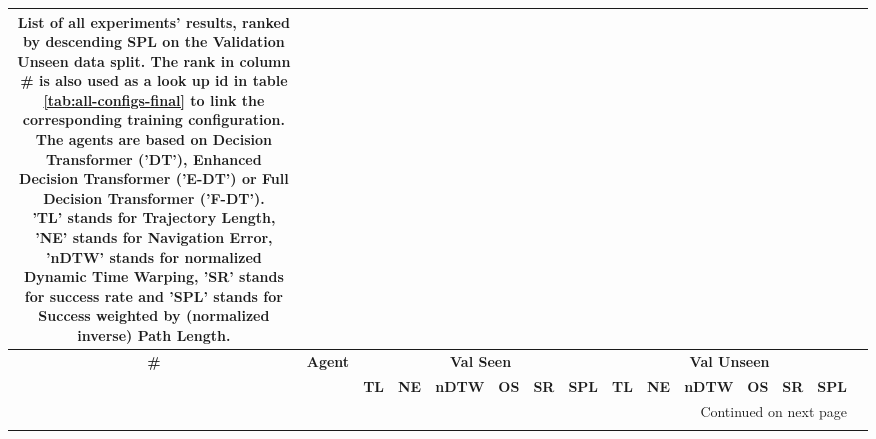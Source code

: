 \begin{longtable}{@{\hskip3pt}c@{\hskip3pt}c@{\hskip3pt}c@{\hskip3pt}c@{\hskip3pt}c@{\hskip3pt}c@{\hskip3pt}c@{\hskip3pt}c@{\hskip3pt}c@{\hskip3pt}c@{\hskip3pt}c@{\hskip3pt}c@{\hskip3pt}c@{\hskip3pt}c@{\hskip3pt}c}
\caption{List of all experiments' results, ranked by descending SPL on the Validation Unseen data split. The rank in column \# is also used as a look up id in table \ref{tab:all-configs-final} to link the corresponding training configuration. \newline The agents are based on Decision Transformer ('DT'), Enhanced Decision Transformer ('E-DT') or Full Decision Transformer ('F-DT').\newline 'TL' stands for Trajectory Length, 'NE' stands for Navigation Error, 'nDTW' stands for normalized Dynamic Time Warping, 'SR' stands for success rate and 'SPL' stands for  Success weighted by (normalized inverse) Path Length.}\\
\toprule
\textbf{\#} & \textbf{Agent} & \multicolumn{6}{c}{\textbf{Val Seen}} & \multicolumn{6}{c}{\textbf{Val Unseen}} \\
\cmidrule(l){4-9} \cmidrule(l){10-15} \textbf{~} &     \textbf{~} &       \textbf{TL} & \textbf{NE} & \textbf{nDTW} & \textbf{OS} & \textbf{SR} & \textbf{SPL} &         \textbf{TL} & \textbf{NE} & \textbf{nDTW} & \textbf{OS} & \textbf{SR} & \textbf{SPL} \\
\midrule
\endhead
\midrule
\multicolumn{14}{r}{{Continued on next page}} \\
\midrule
\endfoot


\end{longtable}

